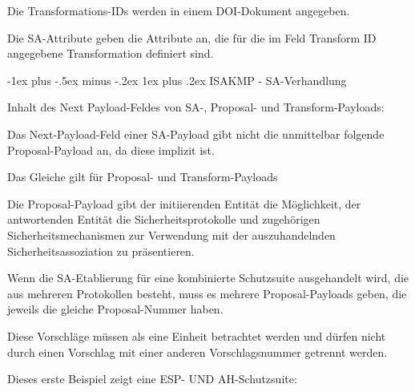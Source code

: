 \documentclass[a4paper]{article}
\makeatletter
\renewcommand{\subsubsection}{\@startsection{subsubsection}{3}{0mm}%
 {-1ex plus -.5ex minus -.2ex}%
 {1ex plus .2ex}%
 {\normalfont\small\bfseries}}
\makeatother
\begin{document}
\begin{multicols}{3}
\begin{itemize*}
\begin{itemize*}
                  \begin{itemize*}
                        \item Die Transformations-IDs werden in einem DOI-Dokument angegeben.
                  \end{itemize*}
                  \item
                  Die SA-Attribute geben die Attribute an, die für die im Feld Transform
                  ID angegebene Transformation definiert sind.
            \end{itemize*}


            \subsubsection{ISAKMP - SA-Verhandlung}

            \begin{itemize*}
                  \item
                  Inhalt des Next Payload-Feldes von SA-, Proposal- und
                  Transform-Payloads:

                  \begin{itemize*}
                        \item Das Next-Payload-Feld einer SA-Payload gibt nicht die unmittelbar folgende Proposal-Payload an, da diese implizit ist.
                        \item Das Gleiche gilt für Proposal- und Transform-Payloads
                  \end{itemize*}
                  \item
                  Die Proposal-Payload gibt der initiierenden Entität die Möglichkeit,
                  der antwortenden Entität die Sicherheitsprotokolle und zugehörigen
                  Sicherheitsmechanismen zur Verwendung mit der auszuhandelnden
                  Sicherheitsassoziation zu präsentieren.
                  \item
                  Wenn die SA-Etablierung für eine kombinierte Schutzsuite ausgehandelt
                  wird, die aus mehreren Protokollen besteht, muss es mehrere
                  Proposal-Payloads geben, die jeweils die gleiche Proposal-Nummer
                  haben.
                  \item
                  Diese Vorschläge müssen als eine Einheit betrachtet werden und dürfen
                  nicht durch einen Vorschlag mit einer anderen Vorschlagsnummer
                  getrennt werden.
                  \item
                  Dieses erste Beispiel zeigt eine ESP- UND AH-Schutzsuite:


\end{itemize*}
\end{itemize*}
\end{multicols}
\end{document}
